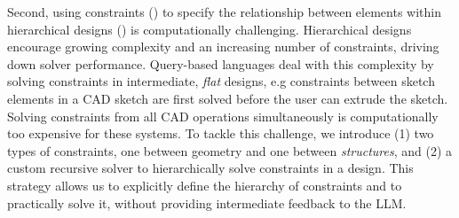 Second, using constraints (\dgtwo{}) to specify the relationship between elements within hierarchical designs (\dgfour{}) is computationally challenging.
Hierarchical designs encourage growing complexity and an increasing number of constraints, driving down solver performance. 
Query-based languages deal with this complexity by solving constraints in intermediate, \emph{flat} designs, e.g constraints between sketch elements in a CAD sketch are first solved before the user can extrude the sketch.
Solving constraints from all CAD operations simultaneously is computationally too expensive for these systems. 
To tackle this challenge, we introduce (1) two types of constraints, one between geometry and one between \emph{structures}, and (2) a custom recursive solver to hierarchically solve constraints in a design.
This strategy allows us to explicitly define the hierarchy of constraints and to practically solve it, without providing intermediate feedback to the LLM.





